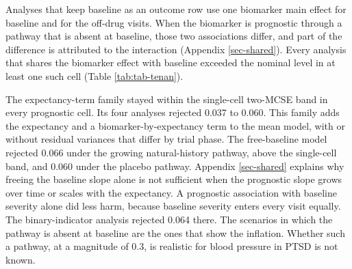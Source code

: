 \documentclass[
  11pt,
]{article}
\begin{document}
Analyses that keep baseline as an outcome row use one biomarker main
effect for baseline and for the off-drug visits. When the biomarker is
prognostic through a pathway that is absent at baseline, those two
associations differ, and part of the difference is attributed to the
interaction (Appendix \ref{sec-shared}). Every analysis that shares
the biomarker effect with baseline exceeded the nominal level in at
least one such cell (Table \ref{tab:tab-tenan}).

The expectancy-term family stayed within the single-cell two-MCSE band
in every prognostic cell. Its four analyses rejected
0.037 to
0.060. This family adds
the expectancy and a biomarker-by-expectancy term to the mean model,
with or without residual variances that differ by trial phase. The
free-baseline model rejected 0.066
under the growing natural-history pathway, above the single-cell band,
and 0.060 under the placebo pathway.
Appendix \ref{sec-shared} explains why freeing the baseline slope
alone is not sufficient when the prognostic slope grows over time or
scales with the expectancy. A prognostic association with baseline
severity alone did less harm, because baseline severity enters every
visit equally. The binary-indicator analysis rejected
0.064 there. The scenarios in which the
pathway is absent at baseline are the ones that show the inflation.
Whether such a pathway, at a magnitude of 0.3, is realistic for blood
pressure in PTSD is not known.
\end{document}
